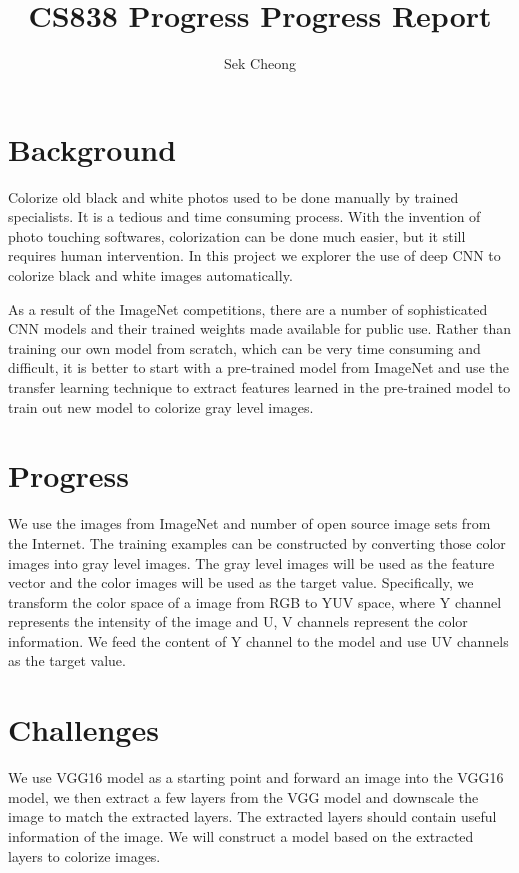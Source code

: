 \documentclass[12pt]{article}
\begin{document}
\title{CS838 Progress Progress Report}
\author{Sek Cheong}
\maketitle


\section{Background}
Colorize old black and white photos used to be done manually by trained specialists. It is a tedious and time consuming process. With the invention of photo touching softwares, colorization can be done much easier, but it still requires human intervention. In this project we explorer the use of deep CNN to colorize black and white images automatically. 


As a result of the ImageNet competitions, there are a number of sophisticated CNN models and their trained weights made available for public use. Rather than training our own model from scratch, which can be very time consuming and difficult, it is better to start with a pre-trained model from ImageNet and use the transfer learning technique to extract features learned in the pre-trained model to train out new model to colorize gray level images.


\section{Progress}
We use the images from ImageNet and number of open source image sets from the Internet. The training examples can be constructed by converting those color images into gray level images. The gray level images will be used as the feature vector and the color images will be used as the target value. Specifically, we transform the color space of a image from RGB to YUV space, where Y channel represents the intensity of the image and U, V channels represent the color information. We feed the content of Y channel to the model and use UV channels as the target value. 


\section{Challenges}
We use VGG16 model as a starting point and forward an image into the VGG16 model, we then extract a few layers from the VGG model and downscale the image to match the extracted layers. The extracted layers should contain useful information of the image. We will construct a model based on the extracted layers to colorize images.  
\end{document}
